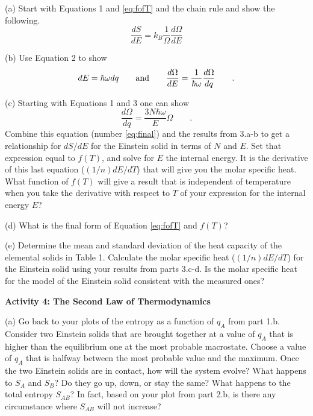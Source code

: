 (a) Start with Equations 1 and \ref{eq:fofT} and the chain rule and show the following.
\begin{equation}
\frac{dS}{dE} = k_B \frac{1}{\Omega} \frac{d\Omega}{dE}
\end{equation}
\vspace{15mm}

(b) Use Equation 2 to show 
\begin{equation}
dE = \hbar \omega dq \qquad {\rm and} \qquad  
    \frac{d\Omega}{dE}=\frac{1}{\hbar\omega} \frac{d\Omega}{dq}
\qquad .
\end{equation}
\vspace{15mm}

(c) Starting with Equations 1 and 3 one can show
\begin{equation}\label{eq:final}
\frac{d\Omega}{dq} = \frac{3N\hbar \omega}{E} \Omega
\qquad .
\end{equation}
Combine this equation (number \ref{eq:final}) and the  results from 3.a-b to 
get a relationship for $dS/dE$ for the Einstein solid in terms
of $N$ and $E$.
Set that expression equal to $f(T)$,
and solve for $E$ the internal energy.
It is the derivative of this last equation ($(1/n)dE/dT$) that will give you the molar specific heat.
What function of $f(T)$ will give a result that is independent of temperature when you
take the derivative with respect to $T$ of your expression for the internal energy $E$?
\vspace{45mm}

(d)  What is the final form of Equation \ref{eq:fofT} and $f(T)$?
\vspace{15mm}

\newpage

(e) Determine the mean and standard deviation of the heat capacity of the elemental solids in
Table 1.
Calculate the molar specific heat ($(1/n)dE/dT$) for the Einstein solid using your results from
parts 3.c-d.
Is the molar specific heat for the model of the Einstein solid consistent with the measured ones?
\vspace{45mm}


\textbf{Activity 4: The Second Law of Thermodynamics}

(a) Go back to your plots of the entropy as a function of $q_A$ from part 1.b. 
Consider two Einstein solids that are brought together at a value of $q_A$ that is higher
than the equilibrium one at the most probable macrostate.
Choose a value of $q_A$ that is halfway between the most probable value and the maximum.
Once the two Einstein solids are in contact, how will the system evolve?
What happens to $S_A$ and $S_B$? Do they go up, down, or stay the same?
What happens to the total entropy $S_{AB}$?
In fact, based on your plot from part 2.b, is there any circumstance where
$S_{AB}$ will not increase?
\vspace{30mm}

